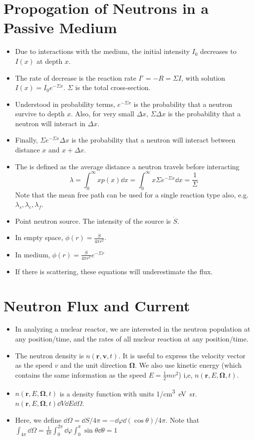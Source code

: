 \documentclass[a4paper]{article}
\begin{document}
\section{Propogation of Neutrons in a Passive Medium}
\begin{itemize}
    \item Due to interactions with the medium, the initial intensity $I_0$ decreases to $I(x)$ at depth $x$.
    \item The rate of decrease is the reaction rate $I'=-R=\Sigma I$, with solution $I(x)=I_0e^{-\Sigma x}$. $\Sigma$ is the total cross-section. 
    \item Understood in probability terms, $e^{-\Sigma x}$ is the probability that a neutron survive to depth $x$. Also, for very small $\Delta x$, $\Sigma\Delta x$ is the probability that a neutron will interact in $\Delta x$.
    \item Finally, $\Sigma e^{-\Sigma x}\Delta x$ is the probability that a neutron will interact between distance $x$ and $x+\Delta x$.
    \item The  is defined as the average distance a neutron travels before interacting \begin{equation}
        \lambda=\int_0^\infty xp(x)\dd x=\int_0^\infty x\Sigma e^{-\Sigma x}\dd x=\frac{1}{\Sigma}
    \end{equation}
    Note that the mean free path can be used for a single reaction type also, e.g. $\lambda_s, \lambda_c, \lambda_f$.
    \item Point neutron source. The intensity of the source is $\dot S$. 
    \item In empty space, $\phi(r)=\frac{\dot S}{4\pi r^2}$.
    \item In medium, $\phi(r)=\frac{\dot S}{4\pi r^2}e^{-\Sigma r}$
    \item If there is scattering, these equations will underestimate the flux.
\end{itemize}
\section{Neutron Flux and Current}
\begin{itemize}
    \item In analyzing a nuclear reactor, we are interested in the neutron population at any position/time, and the rates of all nuclear reaction at any position/time.
    \item The neutron density is $n(\mathbf r, \mathbf v, t)$. It is useful to express the velocity vector as the speed $v$ and the unit direction $\mathbf\Omega$. We also use kinetic energy (which contains the same information as the speed $E=\frac{1}{2}mv^2$) i,e, $n(\mathbf r,E,\mathbf\Omega, t)$.
    \item $n(\mathbf r,E,\mathbf\Omega, t)$ is a density function with units \si{1/cm^3\electronvolt\steradian}. $n(\mathbf r,E,\mathbf\Omega, t)\dd V\dd E\dd\Omega$.
    \item Here, we define $\dd\Omega=\dd S/4\pi=-\dd\varphi\dd(\cos\theta)/4\pi$. Note that $\int_{4\pi}\dd\Omega=\frac{1}{4\pi}\int_0^{2\pi}\dd\varphi\int_0^\pi\sin\theta\dd\theta=1$
\end{itemize}
\end{document}
